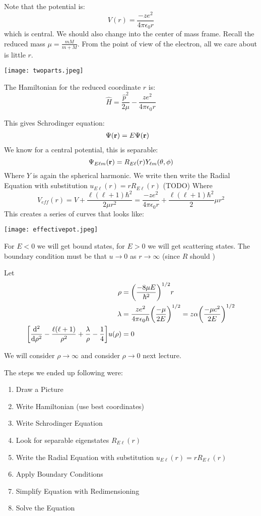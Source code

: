 Note that the potential is:
\[ V(r) = \frac{-ze^2}{4 \pi \epsilon_0 r} \]
which is central. We should also change into the center of mass frame.
Recall the reduced mass $\mu = \frac{mM}{m + M}$. From the point of view of the electron, all we care about is little $r$.

\texttt{[image: twoparts.jpeg]}

The Hamiltonian for the reduced coordinate $r$ is:
\[ \hat{H} = \frac{\hat{p}^2}{2\mu} - \frac{ze^2}{4\pi\epsilon_0 r} \]

This gives Schrodinger equation:
\begin{align*}
    [-\frac{\hbar^2}{2\mu}\nabla^2 - \frac{ze^2}{4\pi\epsilon_0 r}] \Psi(\mbf{r}) &= E \Psi(\mbf{r})
\end{align*}
We know for a central potential, this is separable:
\[ \Psi_{E\ell m}(\mathbf{r}) = R_{E \ell}(r) Y_{\ell m}(\theta, \phi) \]
Where $Y$ is again the spherical harmonic. We write then write the Radial Equation with substitution $u_{E\ell}(r) = r R_{E\ell}(r)$
(TODO)
Where 
\[ V_{eff}(r) = V + \frac{\ell(\ell + 1)\hbar^2}{2\mu r^2} = \frac{-ze^2}{4\pi\epsilon_0 r} + \frac{\ell(\ell + 1)\hbar^2} 2\mu r^2\]
This creates a series of curves that looks like:

\texttt{[image: effectivepot.jpeg]}

For $E < 0$ we will get bound states, for $E > 0$ we will get scattering states.
The boundary condition must be that $u \to 0$ as $r \to \infty$ (since $R$ should )

Let
\begin{align*}
    \rho &= \qty(\frac{-8\mu E}{\hbar^2})^{1/2} r \\
    \lambda &= \frac{ze^2}{4\pi\epsilon_0 \hbar} \qty(\frac{-\mu}{2E})^{1/2} = z \alpha \qty(\frac{-\mu c^2}{2E})^{1/2} \\
    \qty[\dv{^2}{\rho^2} - \frac{\ell(\ell + 1)}{\rho^2} + \frac{\lambda}{\rho} - \frac{1}{4}] u(\rho) &= 0
\end{align*}

We will consider $\rho \to \infty$ and consider $\rho \to 0$ next lecture.

The steps we ended up following were:
\begin{enumerate}
    \item Draw a Picture
    \item Write Hamiltonian (use best coordinates)
    \item Write Schrodinger Equation
    \item Look for separable eigenstates $R_{E\ell}(r)$
    \item Write the Radial Equation with substitution $u_{E\ell}(r) = r R_{E\ell}(r)$
    \item Apply Boundary Conditions
    \item Simplify Equation with Redimensioning
    \item Solve the Equation
\end{enumerate}